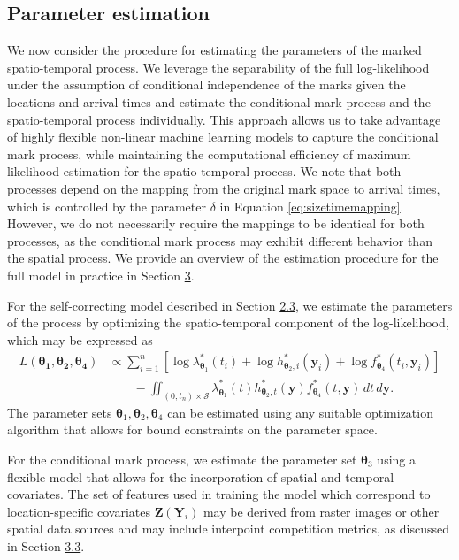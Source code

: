 \subsection{Parameter estimation}\label{parameter-estimation}

We now consider the procedure for estimating the parameters of the
marked spatio-temporal process. We leverage the separability of the full
log-likelihood under the assumption of conditional independence of the
marks given the locations and arrival times and estimate the conditional
mark process and the spatio-temporal process individually. This approach
allows us to take advantage of highly flexible non-linear machine
learning models to capture the conditional mark process, while
maintaining the computational efficiency of maximum likelihood
estimation for the spatio-temporal process. We note that both processes
depend on the mapping from the original mark space to arrival times,
which is controlled by the parameter \(\delta\) in Equation
\eqref{eq:sizetimemapping}. However, we do not necessarily require the
mappings to be identical for both processes, as the conditional mark
process may exhibit different behavior than the spatial process. We
provide an overview of the estimation procedure for the full model in
practice in Section \hyperref[sec:package]{3}.

For the self-correcting model described in Section \hyperref[selfcorrecting]{2.3}, we estimate the parameters of the process by
optimizing the spatio-temporal component of the log-likelihood, which
may be expressed as \begin{align*}
L(\boldsymbol{\theta_1}, \boldsymbol{\theta_2}, \boldsymbol{\theta_4}) &\propto \sum_{i=1}^n \left[ \log \lambda_{\boldsymbol{\theta}_1}^*(t_i) + \log h_{\boldsymbol{\theta}_2,i}^*(\boldsymbol{y}_i) + \log f_{\boldsymbol{\theta}_4}^*(t_i, \boldsymbol{y}_i) \right] \\
&\qquad - \iint_{(0, t_n) \times \mathscr{S}} \lambda_{\boldsymbol{\theta}_1}^*(t) h_{\boldsymbol{\theta}_2,t}^*(\boldsymbol{y}) f_{\boldsymbol{\theta}_4}^*(t, \boldsymbol{y}) \, dt \, d\boldsymbol{y}.
\end{align*} The parameter sets
\(\boldsymbol{\theta}_1, \boldsymbol{\theta}_2, \boldsymbol{\theta}_4\)
can be estimated using any suitable optimization algorithm that allows
for bound constraints on the parameter space.

For the conditional mark process, we estimate the parameter set
\(\boldsymbol{\theta}_3\) using a flexible model that allows for the
incorporation of spatial and temporal covariates. The set of features
used in training the model which correspond to location-specific
covariates \(\boldsymbol{Z}(\boldsymbol{Y}_i)\) may be derived from raster
images or other spatial data sources and may include interpoint
competition metrics, as discussed in Section \hyperref[markmodel]{3.3}.

